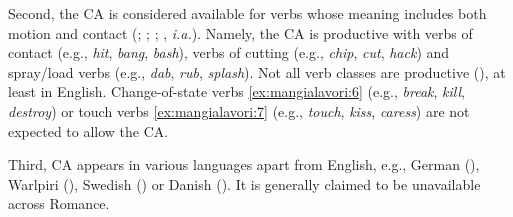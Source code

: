 \documentclass[output=paper,colorlinks,citecolor=brown,
]{langscibook}
\begin{document}
\ea\label{ex:mangialavori:5}
  \z 
\z 

Second, the CA is considered available for verbs whose meaning includes both motion and contact (\citealt{Guersseletal1985}; \citealt{Levin1993}; \citealt{Goldberg1995}; \citealt{vanderLeek1996}, \textit{i.a.}). Namely, the CA is productive with verbs of contact (e.g., \textit{hit}, \textit{bang}, \textit{bash}), verbs of cutting (e.g., \textit{chip}, \textit{cut}, \textit{hack}) and spray/load verbs (e.g., \textit{dab}, \textit{rub}, \textit{splash}). Not all verb classes are productive (\citealt{Levin1993}), at least in English. Change-of-state verbs  \ref{ex:mangialavori:6} (e.g., \textit{break}, \textit{kill}, \textit{destroy}) or touch verbs  \ref{ex:mangialavori:7} (e.g., \textit{touch}, \textit{kiss}, \textit{caress}) are not expected to allow the CA.

\ea\label{ex:mangialavori:6}
  \z 
\z 
\ea\label{ex:mangialavori:7}
  \z 
\z 

Third, CA appears in various languages apart from English, e.g., German (\citealt{FrenseandBennet1996}), Warlpiri (\citealt{Laughren1988}), Swedish (\citealt{Andersson1983}) or Danish (\citealt{Durst-AndersenandHerslund1996}). It is generally claimed to be unavailable across Romance.

\ea
\settowidth{}
  \z 
\z 
\end{document}
